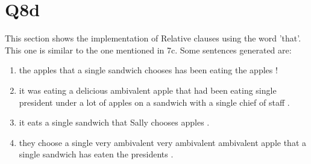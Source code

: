 \documentclass[12pt]{article}
\begin{document}
\section*{Q8d}
This section shows the implementation of Relative clauses using the word 'that'. This one is similar to the one mentioned in 7c. Some sentences generated are:\\
\begin{enumerate}
	\item the  apples  that  a  single  sandwich  chooses  has  been  eating  the  apples  !  
	\item it  was  eating  a  delicious  ambivalent  apple  that  had  been  eating  single  president  under  a  lot  of  apples  on  a  sandwich  with  a  single  chief  of  staff  . 
	\item it  eats  a  single  sandwich  that  Sally  chooses  apples  . 
	\item they  choose a  single  very  ambivalent  very  ambivalent  ambivalent  apple that a  single  sandwich  has  eaten the  presidents  .
\end{enumerate}
\end{document}
